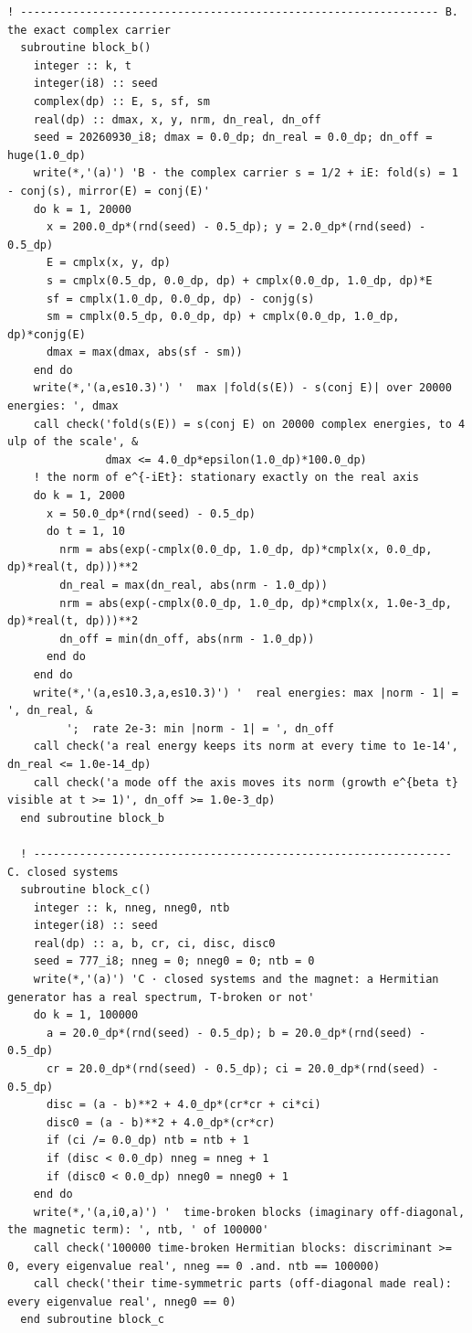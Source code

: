 \documentclass[10pt]{article}
\begin{document}
\begin{multicols}{2}
\begin{Verbatim}[fontsize=\fontsize{6.2}{7.2}\selectfont,breaklines,breakanywhere,breaksymbolleft={}]
  ! ---------------------------------------------------------------- B. the exact complex carrier
  subroutine block_b()
    integer :: k, t
    integer(i8) :: seed
    complex(dp) :: E, s, sf, sm
    real(dp) :: dmax, x, y, nrm, dn_real, dn_off
    seed = 20260930_i8; dmax = 0.0_dp; dn_real = 0.0_dp; dn_off = huge(1.0_dp)
    write(*,'(a)') 'B · the complex carrier s = 1/2 + iE: fold(s) = 1 - conj(s), mirror(E) = conj(E)'
    do k = 1, 20000
      x = 200.0_dp*(rnd(seed) - 0.5_dp); y = 2.0_dp*(rnd(seed) - 0.5_dp)
      E = cmplx(x, y, dp)
      s = cmplx(0.5_dp, 0.0_dp, dp) + cmplx(0.0_dp, 1.0_dp, dp)*E
      sf = cmplx(1.0_dp, 0.0_dp, dp) - conjg(s)
      sm = cmplx(0.5_dp, 0.0_dp, dp) + cmplx(0.0_dp, 1.0_dp, dp)*conjg(E)
      dmax = max(dmax, abs(sf - sm))
    end do
    write(*,'(a,es10.3)') '  max |fold(s(E)) - s(conj E)| over 20000 energies: ', dmax
    call check('fold(s(E)) = s(conj E) on 20000 complex energies, to 4 ulp of the scale', &
               dmax <= 4.0_dp*epsilon(1.0_dp)*100.0_dp)
    ! the norm of e^{-iEt}: stationary exactly on the real axis
    do k = 1, 2000
      x = 50.0_dp*(rnd(seed) - 0.5_dp)
      do t = 1, 10
        nrm = abs(exp(-cmplx(0.0_dp, 1.0_dp, dp)*cmplx(x, 0.0_dp, dp)*real(t, dp)))**2
        dn_real = max(dn_real, abs(nrm - 1.0_dp))
        nrm = abs(exp(-cmplx(0.0_dp, 1.0_dp, dp)*cmplx(x, 1.0e-3_dp, dp)*real(t, dp)))**2
        dn_off = min(dn_off, abs(nrm - 1.0_dp))
      end do
    end do
    write(*,'(a,es10.3,a,es10.3)') '  real energies: max |norm - 1| = ', dn_real, &
         ';  rate 2e-3: min |norm - 1| = ', dn_off
    call check('a real energy keeps its norm at every time to 1e-14', dn_real <= 1.0e-14_dp)
    call check('a mode off the axis moves its norm (growth e^{beta t} visible at t >= 1)', dn_off >= 1.0e-3_dp)
  end subroutine block_b

  ! ---------------------------------------------------------------- C. closed systems
  subroutine block_c()
    integer :: k, nneg, nneg0, ntb
    integer(i8) :: seed
    real(dp) :: a, b, cr, ci, disc, disc0
    seed = 777_i8; nneg = 0; nneg0 = 0; ntb = 0
    write(*,'(a)') 'C · closed systems and the magnet: a Hermitian generator has a real spectrum, T-broken or not'
    do k = 1, 100000
      a = 20.0_dp*(rnd(seed) - 0.5_dp); b = 20.0_dp*(rnd(seed) - 0.5_dp)
      cr = 20.0_dp*(rnd(seed) - 0.5_dp); ci = 20.0_dp*(rnd(seed) - 0.5_dp)
      disc = (a - b)**2 + 4.0_dp*(cr*cr + ci*ci)
      disc0 = (a - b)**2 + 4.0_dp*(cr*cr)
      if (ci /= 0.0_dp) ntb = ntb + 1
      if (disc < 0.0_dp) nneg = nneg + 1
      if (disc0 < 0.0_dp) nneg0 = nneg0 + 1
    end do
    write(*,'(a,i0,a)') '  time-broken blocks (imaginary off-diagonal, the magnetic term): ', ntb, ' of 100000'
    call check('100000 time-broken Hermitian blocks: discriminant >= 0, every eigenvalue real', nneg == 0 .and. ntb == 100000)
    call check('their time-symmetric parts (off-diagonal made real): every eigenvalue real', nneg0 == 0)
  end subroutine block_c


\end{Verbatim}
\end{multicols}
\end{document}
